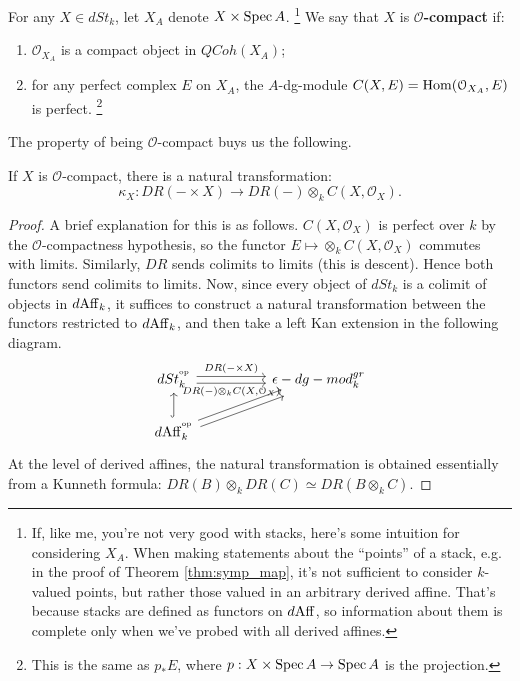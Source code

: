 \begin{defin}
For any $X \in dSt_k$, let $X_A$ denote $X \times \operatorname{Spec} A$.
\footnote{If, like me, you're not very good with stacks, here's some intuition for considering $X_A$. When making statements
about the ``points'' of a stack, e.g. in the proof of Theorem \ref{thm:symp_map}, it's not sufficient to consider $k$-valued
points, but rather those valued in an arbitrary derived affine. That's because stacks are defined as functors on
$d\mathrm{Aff}$, so information about them is complete only when we've probed with all derived affines.} 
We say that $X$ is $\mathcal{O}$\textbf{-compact} if:
\begin{enumerate}
\item $\mathcal{O}_{X_A}$ is a compact object in $QCoh(X_A)$;
\item for any perfect complex $E$ on $X_A$, the $A$-dg-module $C(X,E) = \operatorname{Hom}(\mathcal{O}_{X_A},E)$ is perfect.
\footnote{This is the same as $p_* E$, where $p:X\times \operatorname{Spec} A \to \operatorname{Spec} A$ is the projection.}
\end{enumerate}
\end{defin}

The property of being $\mathcal{O}$-compact buys us the following.
\begin{lem}
If $X$ is $\mathcal{O}$-compact, there is a natural transformation:
\[	\kappa_X : DR( - \times X) \to DR(-) \otimes_k C(X,\mathcal{O}_X).	\]
\end{lem}
\begin{proof}
A brief explanation for this is as follows. $C(X,\mathcal{O}_X)$ is perfect over $k$ by the $\mathcal{O}$-compactness
hypothesis, so the functor $E \mapsto \otimes_k C(X,\mathcal{O}_X)$ commutes with limits. Similarly, $DR$ sends colimits
to limits (this is descent). Hence both functors send colimits to limits. Now, since every object of $dSt_k$ is a colimit
of objects in $d\mathrm{Aff}_k$, it suffices to construct a natural transformation between the functors restricted to $d\mathrm{Aff}_k$,
and then take a left Kan extension in the following diagram.
\[
\begin{tikzcd}
dSt_k^{\op} \arrow[shift left]{rr}{DR(-\times X)}\arrow[shift right,swap]{rr}{DR(-)\otimes_k C(X,\mathcal{O}_X)} 
& &\epsilon - dg-mod_k^{gr} \\
d\Aff_k^{\op}\arrow[hook]{u}\arrow[shift left]{urr}\arrow[shift right]{urr} & &
\end{tikzcd}
\]
At the level of derived affines, the natural transformation is obtained essentially from a Kunneth formula: 
$DR(B)\otimes_k DR(C) \simeq DR(B\otimes_k C)$.
\end{proof}

